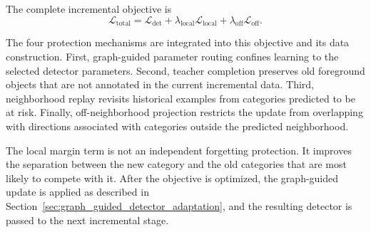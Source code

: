 The complete incremental objective is
\begin{equation}
\mathcal{L}_{\mathrm{total}}
=\mathcal{L}_{\mathrm{det}}
+\lambda_{\mathrm{local}}\mathcal{L}_{\mathrm{local}}
+\lambda_{\mathrm{off}}\mathcal{L}_{\mathrm{off}}.
\label{eq:total_objective}
\end{equation}

The four protection mechanisms are integrated into this objective and its data
construction. First, graph-guided parameter routing confines learning to the
selected detector parameters. Second, teacher completion preserves old
foreground objects that are not annotated in the current incremental data.
Third, neighborhood replay revisits historical examples from categories
predicted to be at risk. Finally, off-neighborhood projection restricts the
update from overlapping with directions associated with categories outside
the predicted neighborhood.

The local margin term is not an independent forgetting protection. It improves
the separation between the new category and the old categories that are most
likely to compete with it. After the objective is optimized, the graph-guided
update is applied as described in
Section~\ref{sec:graph_guided_detector_adaptation}, and the resulting detector
is passed to the next incremental stage.
